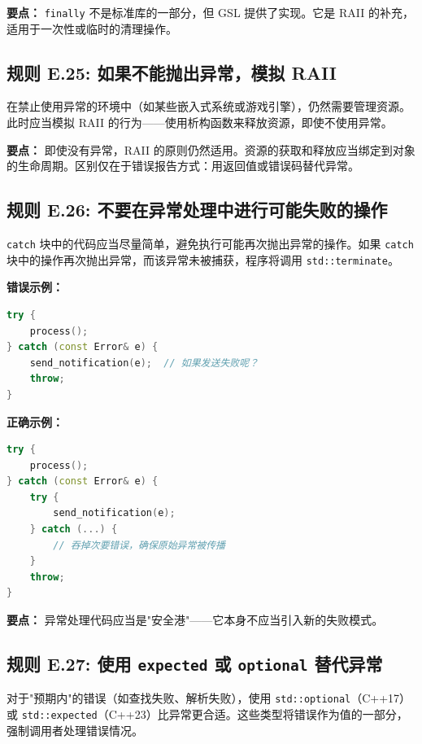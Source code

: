 \textbf{要点：} \texttt{finally} 不是标准库的一部分，但 GSL 提供了实现。它是 RAII 的补充，适用于一次性或临时的清理操作。

\subsection*{\textbf{规则 E.25:} 如果不能抛出异常，模拟 RAII}

在禁止使用异常的环境中（如某些嵌入式系统或游戏引擎），仍然需要管理资源。此时应当模拟 RAII 的行为——使用析构函数来释放资源，即使不使用异常。

\textbf{要点：} 即使没有异常，RAII 的原则仍然适用。资源的获取和释放应当绑定到对象的生命周期。区别仅在于错误报告方式：用返回值或错误码替代异常。

\subsection*{\textbf{规则 E.26:} 不要在异常处理中进行可能失败的操作}

\texttt{catch} 块中的代码应当尽量简单，避免执行可能再次抛出异常的操作。如果 \texttt{catch} 块中的操作再次抛出异常，而该异常未被捕获，程序将调用 \texttt{std::terminate}。

\textbf{错误示例：}

\begin{lstlisting}[language=C++]
try {
    process();
} catch (const Error& e) {
    send_notification(e);  // 如果发送失败呢？
    throw;
}
\end{lstlisting}

\textbf{正确示例：}

\begin{lstlisting}[language=C++]
try {
    process();
} catch (const Error& e) {
    try {
        send_notification(e);
    } catch (...) {
        // 吞掉次要错误，确保原始异常被传播
    }
    throw;
}
\end{lstlisting}

\textbf{要点：} 异常处理代码应当是"安全港"——它本身不应当引入新的失败模式。

\subsection*{\textbf{规则 E.27:} 使用 \texttt{expected} 或 \texttt{optional} 替代异常}

对于"预期内"的错误（如查找失败、解析失败），使用 \texttt{std::optional}（C++17）或 \texttt{std::expected}（C++23）比异常更合适。这些类型将错误作为值的一部分，强制调用者处理错误情况。

